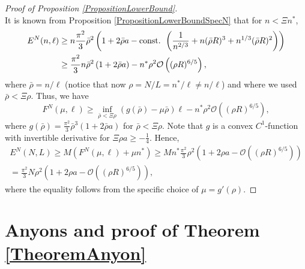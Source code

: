 \documentclass[a4paper,11pt]{article}
\numberwithin{equation}{section}
\begin{document}
\begin{proof}[Proof of Proposition \ref{PropositionLowerBound}]
\begin{equation}
		\end{equation}
		It is known from Proposition \ref{PropositionLowerBoundSpecN} that for $ n<\Xi n^* $,  \begin{equation}
			\begin{aligned}
				E^{N}(n,\ell)&\geq n\frac{\pi^2}{3}\bar{\rho}^2\left(1+2\bar{\rho} a-\textnormal{const. }\left(\frac{1}{n^{2/3}}+n(\bar{\rho} R)^3+n^{1/3}(\bar{\rho} R)^2\right)\right)\\
				&\geq \frac{\pi^2}{3}n\bar{\rho}^2\left(1+2\bar{\rho}a\right)-n^*\rho^2\mathcal{O}\left((\rho R)^{6/5}\right),
			\end{aligned}
		\end{equation}
		where $ \bar{\rho}=n/\ell $ (notice that now $ \rho=N/L=n^\ast/\ell\neq n/\ell $) and where we used $ \bar{\rho}<\Xi\rho$.
		Thus, we have \begin{equation}
			F^{N}(\mu,\ell)\geq \inf_{\bar{\rho}<\Xi\rho}(g(\bar{\rho})-\mu\bar{\rho})\ell-n^\ast \rho^2 \mathcal{O}\left((\rho R)^{6/5}\right),
		\end{equation}
		where $
		g(\bar{\rho})=
		\frac{\pi^2}{3}\bar{\rho}^3\left(1+2\bar{\rho}a\right)
		$ for $ \bar{\rho}<\Xi\rho $. Note that $ g $ is a convex $ C^{1} $-function with invertible derivative for $ \Xi\rho a\geq -\frac{1}{4}  $. Hence, \begin{equation}
			\begin{aligned}
				E^{N}(N,L)\geq M(F^{N}(\mu,\ell)+\mu n^*)\geq Mn^\ast\frac{\pi^2}{3} \rho^2 \left(1+2\rho a-\mathcal{O}\left((\rho R)^{6/5}\right)\right)\\
				=\frac{\pi^2}{3} N\rho^2 \left(1+2\rho a-\mathcal{O}\left((\rho R)^{6/5}\right)\right),
			\end{aligned}
		\end{equation}
		where the equality follows from the specific choice of $ \mu=g'(\rho) $.
	\end{proof}
	
	\section{Anyons and proof of Theorem \ref{TheoremAnyon}}
	\label{SectionOtherSymmetries}
	
\end{document}

